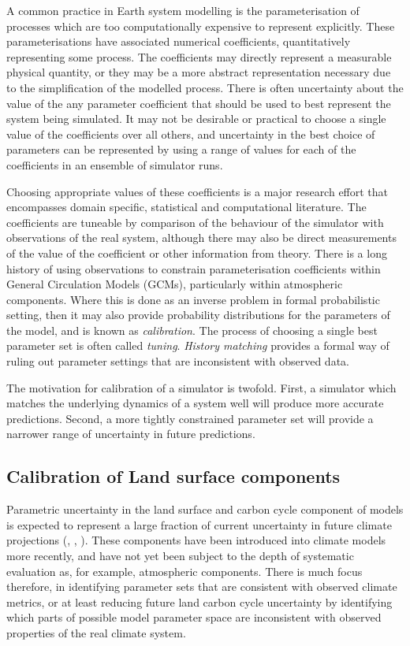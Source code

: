 \documentclass[esd, manuscript]{copernicus}
\begin{document}
\introduction  %
 
A common practice in Earth system modelling is the parameterisation of processes which are too computationally expensive to represent explicitly. These parameterisations have associated numerical coefficients, quantitatively representing some process. The coefficients may directly represent a measurable physical quantity, or they may be a more abstract representation necessary due to the simplification of the modelled process. There is often uncertainty about the value of the any parameter coefficient that should be used to best represent the system being simulated. It may not be desirable or practical to choose a single value of the coefficients over all others, and uncertainty in the best choice of parameters can be represented by using a range of values for each of the coefficients in an ensemble of simulator runs. 

Choosing appropriate values of these coefficients is a major research effort that encompasses domain specific, statistical and computational literature. The coefficients are tuneable by comparison of the behaviour of the simulator with observations of the real system, although there may also be direct measurements of the value of the coefficient or other information from theory. There is a long history of using observations to constrain parameterisation coefficients within General Circulation Models (GCMs), particularly within atmospheric components. Where this is done as an inverse problem in formal probabilistic setting, then it may also provide probability distributions for the parameters of the model, and is known as \emph{calibration}. The process of choosing a single best parameter set is often called \emph{tuning}. \emph{History matching} provides a formal way of ruling out parameter settings that are inconsistent with observed data. 

The motivation for calibration of a simulator is twofold. First, a simulator which matches the underlying dynamics of a system well will produce more accurate predictions. Second, a more tightly constrained parameter set will provide a narrower range of uncertainty in future predictions. 

\subsection{Calibration of Land surface components}

Parametric uncertainty in the land surface and carbon cycle component of models is expected to represent a large fraction of current uncertainty in future climate projections (\citep{booth2012highsensitivity}, \citep{booth2013scenario}, \citep{huntingford2009contributions}). These components have been introduced into climate models more recently, and have not yet been subject to the depth of systematic evaluation as, for example, atmospheric components. There is much focus therefore, in identifying parameter sets that are consistent with observed climate metrics, or at least reducing future land carbon cycle uncertainty by identifying which parts of possible model parameter space are inconsistent with observed properties of the real climate system.  
\end{document}
